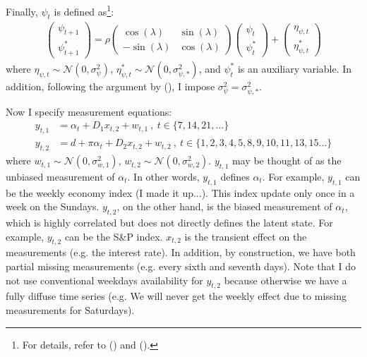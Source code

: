 \documentclass[10pt, titlepage]{article}
\numberwithin{equation}{section}
\begin{document}
Finally, $\psi_t$ is defined as\footnote{For details, refer to (\cite{harvey_1985}) and (\cite{harvey2007trends}).}:
\begin{align}
    \begin{pmatrix}
        \psi_{t+1} \\
        \psi_{t+1}^{*}
    \end{pmatrix}
    =\rho\begin{pmatrix}
        \cos(\lambda) & \sin(\lambda) \\
        -\sin(\lambda) & \cos(\lambda)
    \end{pmatrix}
    \begin{pmatrix}
        \psi_{t} \\
        \psi_{t}^{*}
    \end{pmatrix}
    +\begin{pmatrix}
        \eta_{\psi,t} \\
        \eta_{\psi,t}^{*}
    \end{pmatrix} \label{eq:cycle}
\end{align}
where $\eta_{\psi,t}\sim\mathcal{N}(0,\sigma_{\psi}^2)$, $\eta_{\psi,t}^{*}\sim\mathcal{N}(0,\sigma_{\psi,*}^2)$, and $\psi_{t}^{*}$ is an auxiliary variable. In addition, following the argument by (\cite{harvey_1985}), I impose $\sigma_{\psi}^2=\sigma_{\psi,*}^2$.

Now I specify measurement equations: 
\begin{align}
    y_{t,1} &= \alpha_t+D_1x_{t,2}+w_{t,1} \ , \ t\in\{7,14,21,...\} \\
    y_{t,2} &= d + \pi\alpha_t+D_2x_{t,2}+w_{t,2}\ , \ t\in\{1,2,3,4,5,8,9,10,11,13,15...\} \label{eq:y2}
\end{align}
where $w_{t,1}\sim\mathcal{N}(0,\sigma_{w,1}^2)$, $w_{t,2}\sim\mathcal{N}(0,\sigma_{w,2}^2)$. $y_{t,1}$ may be thought of as the unbiased measurement of $\alpha_t$. In other words, $y_{t,1}$ defines $\alpha_t$. For example, $y_{t,1}$ can be the weekly economy index (I made it up...). This index update only once in a week on the Sundays. $y_{t,2}$, on the other hand, is the biased measurement of $\alpha_t$, which is highly correlated but does not directly defines the latent state. For example, $y_{t,2}$ can be the S\&P index. $x_{t,2}$ is the transient effect on the measurements (e.g. the interest rate). In addition, by construction, we have both partial missing measurements (e.g. every sixth and seventh days). Note that I do not use conventional weekdays availability for $y_{t,2}$ because otherwise we have a fully diffuse time series (e.g. We will never get the weekly effect due to missing measurements for Saturdays).
\end{document}
